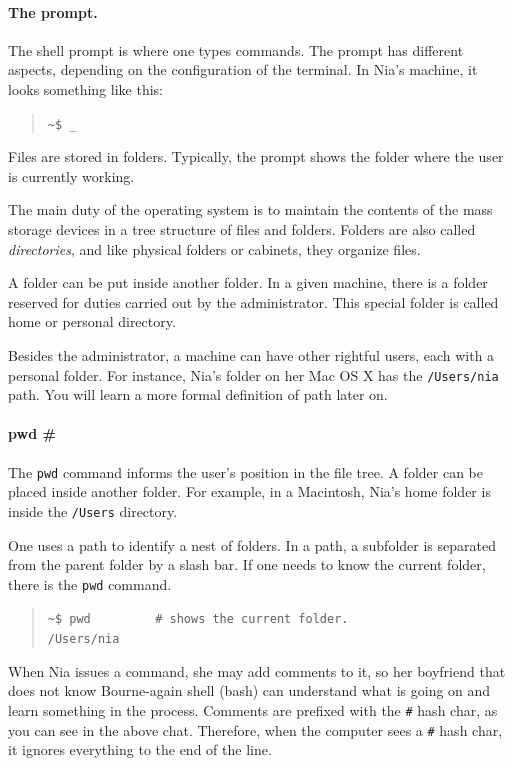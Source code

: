 \documentclass[a4paper,12pt]{book}
\begin{document}
\paragraph{The prompt.} The shell prompt
is where one types commands. The prompt
has different aspects, depending on the
configuration of the terminal.
In Nia's machine, it looks something like this:
\begin{quote}
\verb|~$ _|
\end{quote}
Files are stored in folders. Typically, the
prompt shows the folder where the user is
currently working.

The main duty of the
operating system is to maintain the contents of
the mass storage devices in a tree structure
of files and folders.
Folders are also called {\em directories},
and like physical folders or cabinets,
they organize files.

A folder can be put inside another folder.
In a given machine, there is a folder 
reserved for duties carried out by the
administrator.
This special folder is called home
or personal directory.

Besides the administrator, a machine can
have other rightful users, each with
a personal folder. For instance, Nia's folder
on her Mac OS X has the \verb|/Users/nia|
path. You will learn a more formal
definition of path later on.


\paragraph{pwd \#} The \verb|pwd| command informs
the user's position in the file tree.
A folder can be placed
inside another folder.
For example, in a Macintosh, Nia's home
folder is inside the \verb|/Users| directory.

One uses a path to identify
a nest of folders. In a path, a subfolder
is separated from the parent folder
by a slash bar. If one needs to know
the current folder, there is the \verb|pwd|
command. 
\begin{quote}
\verb|~$ pwd         # shows the current folder. |\\
\verb|/Users/nia|\\
\end{quote}
When Nia issues a command, she may
add comments to it, so her boyfriend that
does not know Bourne-again shell (bash)
can understand what
is going on and learn something in
the process. Comments are prefixed
with the \verb|#| hash char, as you
can see in the above chat. Therefore,
when the computer sees a \verb|#|
hash char, it ignores everything to
the end of the line.
 
\end{document}
